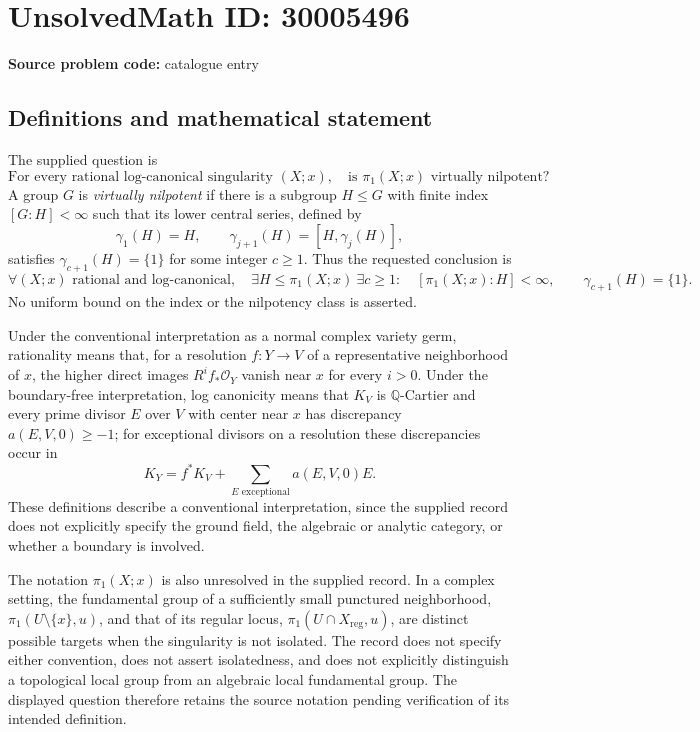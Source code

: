 \documentclass[11pt]{article}
\newcommand{\Q}{\mathbb{Q}}
\begin{document}
\section*{UnsolvedMath ID: 30005496}
\textbf{Source problem code:} catalogue entry
\subsection{Definitions and mathematical statement}
The supplied question is
\[
\text{For every rational log-canonical singularity }(X;x),\quad
\text{is }\pi_1(X;x)\text{ virtually nilpotent?}
\]
A group \(G\) is \emph{virtually nilpotent} if there is a subgroup \(H\leq G\) with finite index \([G:H]<\infty\) such that its lower central series, defined by
\[
\gamma_1(H)=H,\qquad \gamma_{j+1}(H)=[H,\gamma_j(H)],
\]
satisfies \(\gamma_{c+1}(H)=\{1\}\) for some integer \(c\geq 1\). Thus the requested conclusion is
\[
\forall (X;x)\text{ rational and log-canonical},\quad
\exists H\leq\pi_1(X;x)\ \exists c\geq1:\quad
[\pi_1(X;x):H]<\infty,\qquad \gamma_{c+1}(H)=\{1\}.
\]
No uniform bound on the index or the nilpotency class is asserted.

Under the conventional interpretation as a normal complex variety germ, rationality means that, for a resolution \(f:Y\to V\) of a representative neighborhood of \(x\), the higher direct images \(R^i f_*\mathcal O_Y\) vanish near \(x\) for every \(i>0\). Under the boundary-free interpretation, log canonicity means that \(K_V\) is \(\Q\)-Cartier and every prime divisor \(E\) over \(V\) with center near \(x\) has discrepancy \(a(E,V,0)\geq-1\); for exceptional divisors on a resolution these discrepancies occur in
\[
K_Y=f^*K_V+\sum_{E\text{ exceptional}}a(E,V,0)E.
\]
These definitions describe a conventional interpretation, since the supplied record does not explicitly specify the ground field, the algebraic or analytic category, or whether a boundary is involved.

The notation \(\pi_1(X;x)\) is also unresolved in the supplied record. In a complex setting, the fundamental group of a sufficiently small punctured neighborhood, \(\pi_1(U\setminus\{x\},u)\), and that of its regular locus, \(\pi_1(U\cap X_{\mathrm{reg}},u)\), are distinct possible targets when the singularity is not isolated. The record does not specify either convention, does not assert isolatedness, and does not explicitly distinguish a topological local group from an algebraic local fundamental group. The displayed question therefore retains the source notation pending verification of its intended definition.
\end{document}
